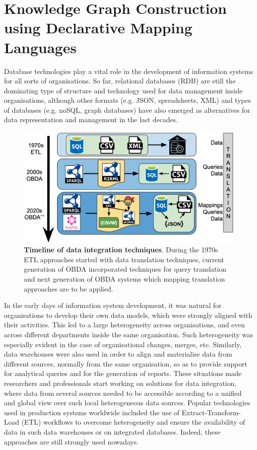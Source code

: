 
\chapter{Knowledge Graph Construction using Declarative Mapping Languages}
Database technologies play a vital role in the development of information systems for all sorts of organisations. So far, relational databases (RDB) are still the dominating type of structure and technology used for data management inside organisations, although other formats (e.g. JSON, spreadsheets, XML) and types of databases (e.g. noSQL, graph databases) have also emerged as alternatives for data representation and management in the last decades. 

\begin{figure}[!ht]
    \centering
    \includegraphics[width=1\columnwidth]{./figures/mt_obda_timeline.png}
    \caption{\textbf{Timeline of data integration techniques}. During the 1970s ETL approaches started with data translation techniques, current generation of OBDA incorporated techniques for query translation and next generation of OBDA systems which mapping translation approaches are to be applied.%
    }
    \label{fig:obdatimeline}
\end{figure}

In the early days of information system development, it was natural for organisations to develop their own data models, which were strongly aligned with their activities. This led to a large heterogeneity across organisations, and even across different departments inside the same organisation. Such heterogeneity was especially evident in the case of organisational changes, merges, etc. Similarly, data warehouses were also used in order to align and materialise data from different sources, normally from the same organisation, so as to provide support for analytical queries and for the generation of reports. These situations made researchers and professionals start working on solutions for data integration, where data from several sources needed to be accessible according to a unified and global view over such local heterogeneous data sources. Popular technologies used in production systems worldwide included the use of Extract-Transform-Load (ETL) workflows to overcome heterogeneity and ensure the availability of data in such data warehouses or on integrated databases. Indeed, these approaches are still strongly used nowadays.

